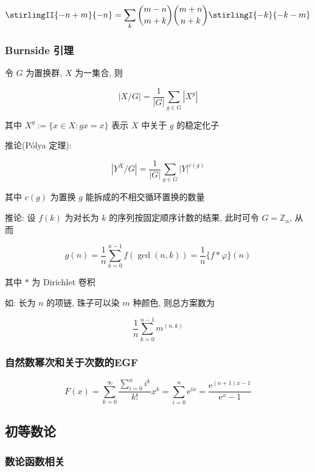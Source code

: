 \begin{equation}
    \stirlingII{-n+m}{-n}=\sum_k\binom{m-n}{m+k}\binom{m+n}{n+k}\stirlingI{-k}{-k-m}
\end{equation}

\subsubsection{Burnside 引理}

令 \(G\) 为置换群, \(X\) 为一集合, 则

\[
    |X/G|=\frac{1}{|G|}\sum_{g\in G}\left|X^g\right|
\]

其中 \(X^g:=\{x\in X:gx=x\}\) 表示 \(X\) 中关于 \(g\) 的稳定化子

推论(P\'olya 定理):

\[
    \left|Y^X/G\right|=\frac{1}{|G|}\sum_{g\in G} |Y|^{c(g)}
\]

其中 \(c(g)\) 为置换 \(g\) 能拆成的不相交循环置换的数量

推论: 设 \(f(k)\) 为对长为 \(k\) 的序列按固定顺序计数的结果, 此时可令 \(G=\mathbb{Z}_n\), 从而

\[
    g(n)=\frac{1}{n}\sum_{k=0}^{n-1}f(\gcd(n,k))=\frac{1}{n} \{f*\varphi\}(n)
\]

其中 \(*\) 为 Dirichlet 卷积

如: 长为 \(n\) 的项链, 珠子可以染 \(m\) 种颜色, 则总方案数为

\[
    \frac{1}{n}\sum_{k=0}^{n-1} m^{(n,k)}
\]

\subsubsection{自然数幂次和关于次数的EGF}

\begin{equation}
    F(x) = \sum_{k=0}^\infty \frac{\sum_{i=0}^n i^k}{k!}x^k = \sum_{i=0}^n \mathrm{e}^{ix} = \frac{\mathrm{e}^{(n+1)x-1}}{\mathrm{e}^x-1}
\end{equation}

\subsection{初等数论}

\subsubsection{数论函数相关}

